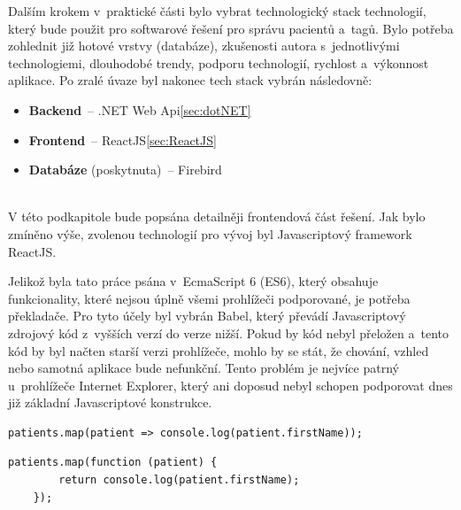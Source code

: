 
Dalším krokem v~praktické části bylo vybrat technologický stack technologií, který bude použit pro softwarové řešení pro správu pacientů a~tagů. Bylo potřeba zohlednit již hotové vrstvy (databáze), zkušenosti autora s~jednotlivými technologiemi, dlouhodobé trendy, podporu technologií, rychlost a~výkonnost aplikace. Po zralé úvaze byl nakonec tech stack vybrán následovně: \\

\begin{itemize}
	\item \textbf{Backend}~-- .NET Web Api\ref{sec:dotNET}
	\item \textbf{Frontend}~-- ReactJS\ref{sec:ReactJS} 
	\item \textbf{Databáze} (poskytnuta)~-- Firebird
\end{itemize}

 \\
V této podkapitole bude popsána detailněji frontendová část řešení. Jak bylo zmíněno výše, zvolenou technologií pro vývoj byl Javascriptový framework ReactJS. \\


Jelikož byla tato práce psána v~EcmaScript 6 (ES6), který obsahuje funkcionality, které nejsou úplně všemi prohlížeči podporované, je potřeba překladače. Pro tyto účely byl vybrán Babel, který převádí Javascriptový zdrojový kód z~vyšších verzí do verze nižší. Pokud by kód nebyl přeložen a~tento kód by byl načten starší verzi prohlížeče, mohlo by se stát, že chování, vzhled nebo samotná aplikace bude nefunkční. Tento problém je nejvíce patrný u~prohlížeče Internet Explorer, který ani doposud nebyl schopen podporovat dnes již základní Javascriptové konstrukce.\cite{23} \\

\begin{lstlisting}[numbers=none, caption=ES6 kód využívající šipkového zápisu anonymní funkce., label=lst:ES6]
	patients.map(patient => console.log(patient.firstName));
\end{lstlisting}

\begin{lstlisting}[numbers=none, caption=ES6 kód po přeložení pomocí Babelu., label=lst:afterBabel]
	patients.map(function (patient) {
		return console.log(patient.firstName);
	});
\end{lstlisting}

